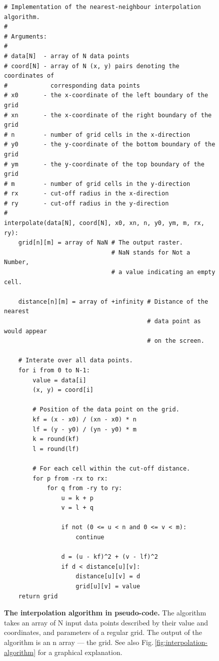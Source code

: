 \begin{figure}[p]
	

\begin{lstlisting}
# Implementation of the nearest-neighbour interpolation algorithm.
#
# Arguments:
#
# data[N]  - array of N data points
# coord[N] - array of N (x, y) pairs denoting the coordinates of
#            corresponding data points
# x0       - the x-coordinate of the left boundary of the grid
# xn       - the x-coordinate of the right boundary of the grid
# n        - number of grid cells in the x-direction
# y0       - the y-coordinate of the bottom boundary of the grid
# ym       - the y-coordinate of the top boundary of the grid
# m        - number of grid cells in the y-direction
# rx       - cut-off radius in the x-direction
# ry       - cut-off radius in the y-direction
#
interpolate(data[N], coord[N], x0, xn, n, y0, ym, m, rx, ry):
    grid[n][m] = array of NaN # The output raster.
                              # NaN stands for Not a Number,
                              # a value indicating an empty cell.
     
    distance[n][m] = array of +infinity # Distance of the nearest
                                        # data point as would appear
                                        # on the screen.
    
    # Interate over all data points.
    for i from 0 to N-1:
        value = data[i]
        (x, y) = coord[i]
        
        # Position of the data point on the grid.
        kf = (x - x0) / (xn - x0) * n
        lf = (y - y0) / (yn - y0) * m
        k = round(kf)
        l = round(lf)
        
        # For each cell within the cut-off distance.
        for p from -rx to rx:
            for q from -ry to ry:
                u = k + p 
                v = l + q

                if not (0 <= u < n and 0 <= v < m):
                    continue
                
                d = (u - kf)^2 + (v - lf)^2
                if d < distance[u][v]:
                    distance[u][v] = d
                    grid[u][v] = value
    return grid
\end{lstlisting}
\caption[The interpolation algorithm in pseudo-code]{\textbf{The interpolation algorithm in pseudo-code.} The algorithm
takes an array of N input data points described by their value and coordinates,
and parameters of a regular grid.
The output of the algorithm is an {n} array — the grid. See also
Fig.\,\ref{fig:interpolation-algorithm} for a
graphical explanation.}
\label{fig:interpolation-algorithm-pseudocode}
\end{figure}
